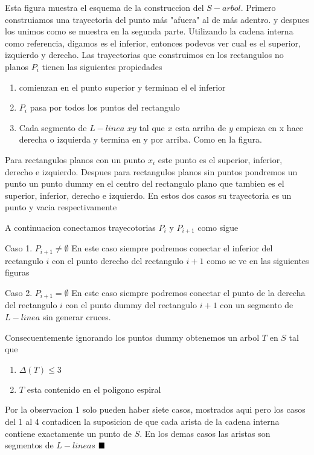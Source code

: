\documentclass[11pt,a4paper]{article}
\begin{document}
Esta figura muestra el esquema de la construccion del $S-arbol$. Primero construiamos  una trayectoria del punto más "afuera" al de más adentro. y despues los unimos como se muestra en la segunda parte. Utilizando la cadena interna como referencia, digamos es el inferior, entonces podevos ver cual es el superior, izquierdo y derecho.
Las trayectorias que construimos en los rectangulos no planos $P_i$ tienen las siguientes propiedades \begin{enumerate}
\item comienzan en el punto superior y terminan el el inferior
\item $P_i$ pasa por todos los puntos del rectangulo
\item Cada segmento de $L-linea$ $xy$ tal que $x$ esta arriba de $y$ empieza en x hace derecha o izquierda y termina en y por arriba. Como en la figura.
\end{enumerate}
Para rectangulos planos con un punto $x_i$ este punto es el superior, inferior, derecho e izquierdo. Despues para rectangulos planos sin puntos pondremos un punto un punto dummy en el centro del rectangulo plano que tambien es el superior, inferior, derecho e izquierdo. En estos dos casos su trayectoria es un punto y vacia respectivamente

A continuacion conectamos trayecotorias $P_i$ y $P_{i+1}$ como sigue

Caso 1. $P_{i+1} \neq \emptyset $ 
En este caso siempre podremos conectar el inferior del rectangulo $i$ con el punto derecho del rectangulo $i+1$ como se ve en las siguientes figuras

Caso 2. $P_{i+1} =\emptyset $ 
En este caso siempre podremos conectar el punto de la derecha del rectangulo $i$ con el punto dummy del rectangulo $i+1$ con un segmento de $L-linea$ sin generar cruces. 

Consecuentemente ignorando los puntos dummy obtenemos un arbol $T$ en $S$ tal que \begin{enumerate}
\item $\Delta (T) \leq 3$
\item $T$ esta contenido en el poligono espiral
\end{enumerate}

Por la observacion 1 solo pueden haber siete casos, mostrados aqui pero los casos del 1 al 4 contadicen la suposicion de que cada arista de la cadena interna contiene exactamente un punto de $S$. En los demas casos las aristas son segmentos de $L-lineas$  $\hfill\ensuremath{\blacksquare} $
\end{document}
